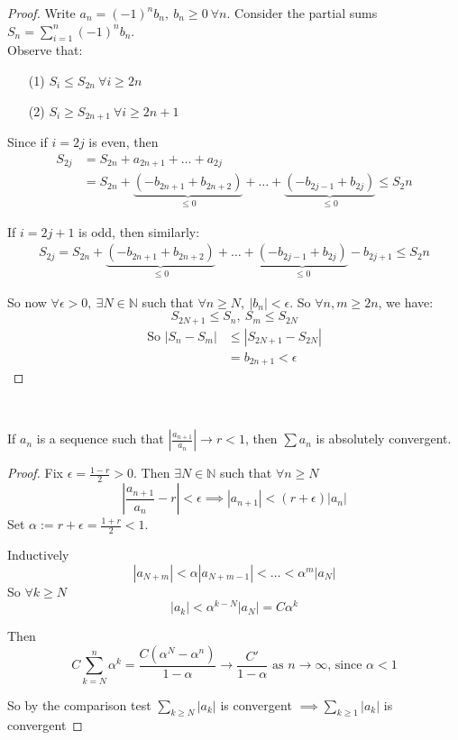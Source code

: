 \begin{proof}
Write $a_n = (-1)^nb_n,~b_n\geq 0 ~\forall n	$. Consider the partial sums $S_n = \sum_{i=1}^{n} (-1)^nb_n$.\\

  Observe that: \begin{enumerate}
 \item[(1)]$S_i \leq S_{2n}~\forall i \geq 2n$
 \item[(2)]$S_i \geq S_{2n+1}~\forall i\geq 2n+1$
 \end{enumerate}
 Since if $i=2j$ is even, then
  \[\begin{aligned}
	S_{2j} &= S_{2n} + a_{2n+1} + \dots + a_{2j}\\ 
	&= S_{2n} + \underbrace{(-b_{2n+1} + b_{2n+2})}_{\leq 0} + \dots + \underbrace{(-b_{2j-1} + b_{2j})}_{\leq 0} \leq S_2n
\end{aligned}
\]
 
  If $i= 2j+1$ is odd, then similarly:
   \[\begin{aligned}
	S_{2j} = S_{2n} + \underbrace{(-b_{2n+1} + b_{2n+2})}_{\leq 0} + \dots + \underbrace{(-b_{2j-1} + b_{2j})}_{\leq 0} - b_{2j+1} \leq S_2n
\end{aligned}
\]
  
 So now $\forall \epsilon >0,~ \exists N \in \mathbb{N}$ such that $\forall n \geq N,~|b_n| < \epsilon$. So $\forall n,m\geq 2n$, we have: \[S_{2N+1} \leq S_n,~S_m \leq S_{2N}\] 
 \[\begin{aligned}\text{So } |S_n - S_m| &\leq |S_{2N+1} - S_{2N}|\\
 &= b_{2n+1} < \epsilon	
\end{aligned}
\]
\end{proof}~

\begin{theorem}
If $a_n$ is a sequence such that $\left|\frac{a_{n+1}}{a_n}\right| \to r < 1$, then $\sum a_n$ is absolutely convergent.	
\end{theorem}
\begin{proof}
Fix $\epsilon = \frac{1-r}{2} > 0$. Then $\exists N \in \mathbb{N}$ such that $\forall n \geq N$
\[\left|\frac{a_{n+1}}{a_n} - r\right| < \epsilon \implies |a_{n+1}| < (r + \epsilon)|a_n|\]
Set $\alpha := r + \epsilon = \frac{1 + r}{2} < 1$. 

Inductively
\[|a_{N+m}| < \alpha|a_{N+m-1}| < \dots < \alpha^m|a_N|\]	
So $\forall k \geq N$ \[|a_k| <  \alpha^{k-N}|a_N| = C\alpha^k\]

Then \[C\sum_{k=N}^{n} \alpha^k = \frac{C(\alpha^N-\alpha^n)}{1-\alpha} \to \frac{C'}{1-\alpha} \text{ as } n \to \infty \text{, since } \alpha < 1\]

So by the comparison test $\sum_{k\geq N} |a_k|$ is convergent $\implies \sum_{k\geq 1} |a_k|$ is convergent
\end{proof}

